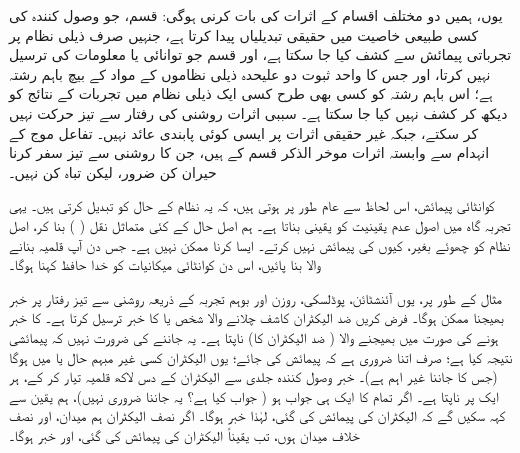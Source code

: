 یوں، ہمیں دو مختلف اقسام کے اثرات کی بات کرنی ہوگی:  قسم، جو وصول کنندہ کی کسی طبیعی خاصیت میں حقیقی تبدیلیاں پیدا کرتا ہے، جنہیں صرف ذیلی نظام پر تجرباتی پیمائش سے کشف کیا جا سکتا ہے، اور  قسم جو توانائی یا معلومات کی ترسیل نہیں کرتا، اور جس کا واحد ثبوت دو علیحدہ ذیلی نظاموں کے مواد کے بیچ باہم رشتہ ہے؛ اس باہم رشتہ کو کسی بھی طرح کسی ایک ذیلی نظام میں تجربات کے نتائج کو دیکھ کر کشف نہیں کیا جا سکتا ہے۔ سببی اثرات روشنی کی رفتار سے تیز حرکت نہیں کر سکتے، جبکہ غیر حقیقی اثرات پر ایسی کوئی پابندی عائد نہیں۔ تفاعل موج کے انہدام سے وابستہ اثرات موخر الذکر قسم کے ہیں، جن کا روشنی سے تیز سفر کرنا حیران کن ضرور، لیکن تباہ کن نہیں۔

کوانٹائی پیمائش، اس لحاظ سے عام طور پر  ہوتی ہیں، کہ یہ نظام کے حال کو تبدیل کرتی ہیں۔ یہی تجربہ گاہ میں اصول عدم یقینیت کو یقینی بناتا ہے۔ ہم اصل حال کے کئی متماثل نقل ( ) بنا کر، اصل نظام کو چھوئے بغیر، کیوں  کی پیمائش نہیں کرتے۔ ایسا کرنا ممکن نہیں ہے۔ جس دن آپ قلمیہ بنانے والا  بنا پائیں، اس دن کوانٹائی میکانیات کو خدا حافظ کہنا ہوگا۔

مثال کے طور پر، یوں آئنشٹائن، پوڈلسکی، روزن اور بوہم تجربہ کے ذریعہ روشنی سے تیز رفتار پر خبر بھیجنا ممکن ہوگا۔ فرض کریں ضد الیکٹران کاشف چلانے والا شخص  یا  کا خبر ترسیل کرتا ہے۔  کا خبر ہونے کی صورت میں بھیجنے والا ( ضد الیکٹران کا)  ناپتا ہے۔ یہ جاننے کی ضرورت نہیں کہ پیمائشی نتیجہ کیا ہے؛ صرف اتنا ضروری ہے کہ پیمائش کی جائے؛ یوں الیکٹران کسی غیر مبہم حال  یا  میں ہوگا (جس کا جاننا غیر اہم ہے)۔ خبر وصول کنندہ جلدی سے الیکٹران کے دس لاکھ قلمیہ تیار کر کے، ہر ایک پر  ناپتا ہے۔ اگر تمام کا ایک ہی جواب ہو ( جواب کیا ہے؟ یہ جاننا ضروری نہیں)، ہم یقین سے کہہ سکیں گے کہ الیکٹران کی پیمائش کی گئی، لہٰذا خبر  ہوگا۔ اگر نصف الیکٹران ہم میدان، اور نصف خلاف میدان ہوں، تب یقیناً الیکٹران کی پیمائش  کی گئی، اور  خبر ہوگا۔

